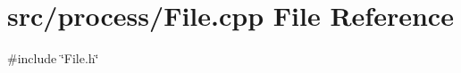 \section{src/process/\+File.cpp File Reference}
\label{_file_8cpp}
{\ttfamily \#include \char`\"{}File.\+h\char`\"{}}\newline

